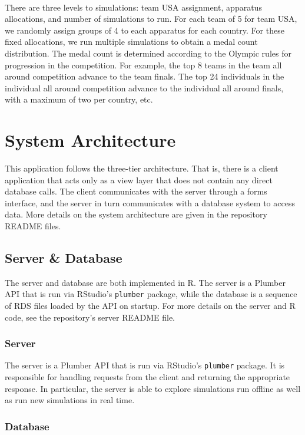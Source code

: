 \documentclass{article}
\begin{document}
\ 

\noindent There are three levels to simulations: team USA assignment, apparatus allocations, and number of simulations to run. 
For each team of 5 for team USA, we randomly assign groups of 4 to each apparatus for each country. For these fixed allocations, 
we run multiple simulations to obtain a medal count distribution. The medal count is determined according to the Olympic rules for progression 
in the competition. For example, the top 8 teams in the team all around competition advance to the team finals. The top 24 
individuals in the individual all around competition advance to the individual all around finals, with a maximum of two per country, etc.

\section{System Architecture}\label{sec:system}
This application follows the three-tier architecture. That is, there is a client
application that acts only as a view layer that does not contain any direct database calls.
The client communicates with the server through a forms interface, and the server
in turn communicates with a database system to access data. More details on 
the system architecture are given in the repository README files.

\subsection{Server \& Database}

The server and database are both implemented in R. The server is a Plumber API that is run via RStudio's \texttt{plumber} package, 
while the database is a sequence of RDS files loaded by the API on startup. For more details on the server and R code,
see the repository's server README file.

\subsubsection{Server}

The server is a Plumber API that is run via RStudio's \texttt{plumber} package. 
It is responsible for handling requests from the client and returning the appropriate 
response. In particular, the server is able to explore simulations run offline 
as well as run new simulations in real time.

\subsubsection{Database}
\end{document}
